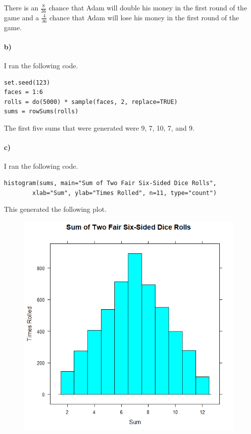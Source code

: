 \documentclass[12pt]{article}
\begin{document}
There is an \(\frac{8}{36}\) chance that Adam will double his money in the first
round of the game and a \(\frac{4}{36}\) chance that Adam will lose his money
in the first round of the game.

\paragraph{b)}

I ran the following code.
\begin{verbatim}
set.seed(123)
faces = 1:6
rolls = do(5000) * sample(faces, 2, replace=TRUE)
sums = rowSums(rolls)
\end{verbatim}
The first five sums that were generated were 9, 7, 10, 7, and 9.

\paragraph{c)}

I ran the following code.
\scriptsize
\begin{verbatim}
histogram(sums, main="Sum of Two Fair Six-Sided Dice Rolls",
        xlab="Sum", ylab="Times Rolled", n=11, type="count")
\end{verbatim}
\normalsize
This generated the following plot.
\begin{figure}[H]
    \begin{center}
        \includegraphics[width=4.5in]{exercise3c.png}
    \end{center}
\end{figure}
\end{document}

